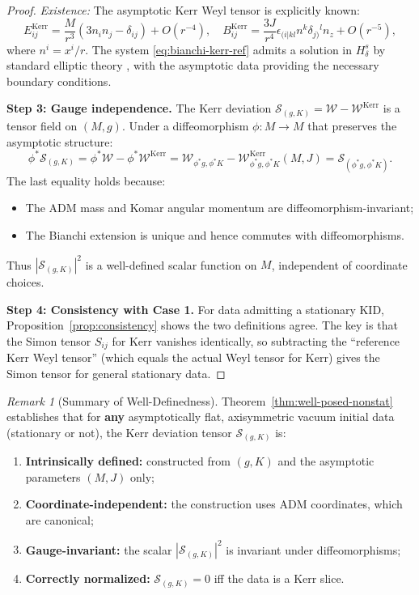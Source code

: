 \documentclass[12pt]{article}
\theoremstyle{plain}
\theoremstyle{definition}
\theoremstyle{remark}
\newtheorem{remark}[theorem]{Remark}
\begin{document}
\begin{proof}
\textit{Existence:} The asymptotic Kerr Weyl tensor is explicitly known:
\[
E^{\mathrm{Kerr}}_{ij} = \frac{M}{r^3}\left(3n_i n_j - \delta_{ij}\right) + O(r^{-4}), \quad B^{\mathrm{Kerr}}_{ij} = \frac{3J}{r^4}\epsilon_{(i|kl}n^k\delta_{j)}{}^l n_z + O(r^{-5}),
\]
where $n^i = x^i/r$. The system \eqref{eq:bianchi-kerr-ref} admits a solution in $H^s_\delta$ by standard elliptic theory \cite{lockhartmccowen1985}, with the asymptotic data providing the necessary boundary conditions.

\textbf{Step 3: Gauge independence.}
The Kerr deviation $\mathcal{S}_{(g,K)} = \mathcal{W} - \mathcal{W}^{\mathrm{Kerr}}$ is a tensor field on $(M, g)$. Under a diffeomorphism $\phi: M \to M$ that preserves the asymptotic structure:
\[
\phi^*\mathcal{S}_{(g,K)} = \phi^*\mathcal{W} - \phi^*\mathcal{W}^{\mathrm{Kerr}} = \mathcal{W}_{\phi^*g, \phi^*K} - \mathcal{W}^{\mathrm{Kerr}}_{\phi^*g, \phi^*K}(M, J) = \mathcal{S}_{(\phi^*g, \phi^*K)}.
\]
The last equality holds because:
\begin{itemize}
    \item The ADM mass and Komar angular momentum are diffeomorphism-invariant;
    \item The Bianchi extension is unique and hence commutes with diffeomorphisms.
\end{itemize}
Thus $|\mathcal{S}_{(g,K)}|^2$ is a well-defined scalar function on $M$, independent of coordinate choices.

\textbf{Step 4: Consistency with Case 1.}
For data admitting a stationary KID, Proposition~\ref{prop:consistency} shows the two definitions agree. The key is that the Simon tensor $S_{ij}$ for Kerr vanishes identically, so subtracting the ``reference Kerr Weyl tensor'' (which equals the actual Weyl tensor for Kerr) gives the Simon tensor for general stationary data.
\end{proof}

\begin{remark}[Summary of Well-Definedness]\label{rem:well-defined}
Theorem~\ref{thm:well-posed-nonstat} establishes that for \textbf{any} asymptotically flat, axisymmetric vacuum initial data (stationary or not), the Kerr deviation tensor $\mathcal{S}_{(g,K)}$ is:
\begin{enumerate}
    \item \textbf{Intrinsically defined:} constructed from $(g, K)$ and the asymptotic parameters $(M, J)$ only;
    \item \textbf{Coordinate-independent:} the construction uses ADM coordinates, which are canonical;
    \item \textbf{Gauge-invariant:} the scalar $|\mathcal{S}_{(g,K)}|^2$ is invariant under diffeomorphisms;
    \item \textbf{Correctly normalized:} $\mathcal{S}_{(g,K)} = 0$ iff the data is a Kerr slice.
\end{enumerate}
\end{remark}
\end{document}

